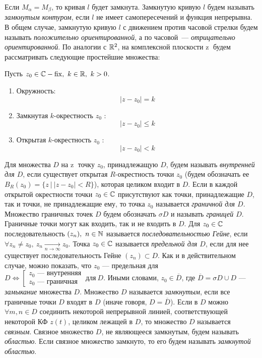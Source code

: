 \documentclass[../../main.tex]{subfiles}
\begin{document}
Если  $M_{\alpha} = M_{\beta}$, то кривая $l$ будет замкнута. 
Замкнутую кривую  $l$ будем называть \emph{замкнутым контуром},
если $l$ не имеет самопересечений и функция непрерывна. В общем
случае, замкнутую кривую  $l$ с движением против часовой стрелки
будем называть \emph{положительно ориентированной}, 
а по часовой~---
\emph{отрицательно ориентированной}. По аналогии  с $\mathbb{R}^2$,
 на комплексной плоскости  \textcircled{z} будем рассматривать следующие  
 простейшие множества:

Пусть $z_0\in \mathbb{C} - \operatorname{fix},\ k \in \mathbb{R},\ k > 0$.
\begin{enumerate}
\item Окружность: \[  |z - z_0| = k\] 
\item Замкнутая $k$-окрестность $z_0$ : \[ |z - z_0| \leq k\] 
\item Открытая $k$-окрестность $z_0$ : \[ |z - z_0| < k\] 
\end{enumerate}

Для множества $D$ на \textcircled{z} точку $z_0$, принадлежащую  $D$, 
будем называть \emph{внутренней для  $D$}, если существует открытая 
$R$-окрестность точки $z_0$ (будем обозначать ее
$B_R(z_0) = \{ z\ |\  |z - z_0| < R \}$), которая целиком входит в  $D$.
Если в каждой открытой окрестности точки 
$z_0 \in \mathbb{C}$ присутствуют как точки, принадлежащие $D$, 
так и точки, не принадлежащие ему, то точка $z_0$ называется 
\emph{граничной для $D$}.
Множество граничных точек $D$ будем обозначать $\sigma\!{D}$ и 
называть \emph{границей $D$}.
Граничные точки могут как входить, так и не входить в $D$. Для $z_0 \in \mathbb{C}$
последовательность
$(z_n),\ n\in\mathbb{N}$ называется \emph{последовательностью Гейне}, если $\forall
z_n\neq z_0, \ z_n \underset{n \longrightarrow \infty}{\longrightarrow} z_0 $.
 Точка $z_0 \in \mathbb{C}$ называется \emph{предельной для $D$},
если для нее существует последовательность Гейне $(z_n) \subset D$. Как и в
действительном случае, можно показать,
 что $z_0$ --- предельная для $D \iff
 \left[\begin{aligned} 
  z_0 \text{ --- внутренняя} \\
  z_0 \text{ --- граничная}
\end{aligned}\right. \ \text{для}\ D$. Иными словами, $z_0 \in \overline{D}$, 
где
$\overline{D} = \sigma\!{D}\cup D$ --- \emph{замыкание} множества $D$.
 Множество $D$ называется \emph{замкнутым}, если все граничные точки $D$
 входят в $D$ (иначе говоря, $D = \overline{D}$). 
Если в $D$ можно $\forall m, n \in D$ соединить некоторой непрерывной линией,
соответствующей некоторой
 КФ $z(t)$, целиком лежащей в $D$, то множество $D$ называется  \emph{связным}.
Связное множество $D$, не являющееся замкнутым, будем называть \emph{областью}.
Если связное множество замкнуто, то его будем называть \emph{замкнутой
областью}.
 
\end{document}
